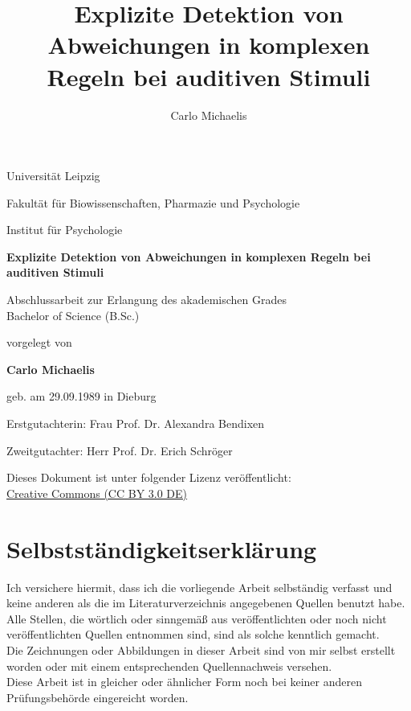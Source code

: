 \documentclass[doc,a4paper,12pt]{apa6}
\title{Explizite Detektion von Abweichungen in komplexen Regeln bei auditiven Stimuli}
\author{Carlo Michaelis}
\begin{document}

\thispagestyle{empty}

\begin{spacing}{1.1}
\begin{center}

\Large Universität Leipzig

\setlength{\parskip}{0.8em}
\normalsize Fakultät für Biowissenschaften, Pharmazie und Psychologie

\setlength{\parskip}{0.4em}
\normalsize Institut für Psychologie

\setlength{\parskip}{6em}
\LARGE \textbf{Explizite Detektion von Abweichungen in komplexen Regeln bei auditiven Stimuli}

\setlength{\parskip}{1.8em}
\normalsize Abschlussarbeit zur Erlangung des akademischen Grades\\ Bachelor of Science (B.Sc.)

\setlength{\parskip}{1.2em}
\normalsize vorgelegt von

\setlength{\parskip}{1.8em}
\Large \textbf{Carlo Michaelis}

\setlength{\parskip}{0.5em}
\normalsize geb. am 29.09.1989 in Dieburg

\setlength{\parskip}{3em}

Erstgutachterin: Frau Prof. Dr. Alexandra Bendixen

\setlength{\parskip}{0.3em}
Zweitgutachter: Herr Prof. Dr. Erich Schröger

\vfill

Dieses Dokument ist unter folgender Lizenz veröffentlicht:\\ \href{http://creativecommons.org/licenses/by/3.0/de/}{Creative Commons (CC BY 3.0 DE)}

\end{center}
\end{spacing}
\newpage

\section*{Selbstständigkeitserklärung}

Ich versichere hiermit, dass ich die vorliegende Arbeit selbständig verfasst und keine
anderen als die im Literaturverzeichnis angegebenen Quellen benutzt habe.\\
Alle Stellen, die wörtlich oder sinngemäß aus veröffentlichten oder noch nicht veröffentlichten
Quellen entnommen sind, sind als solche kenntlich gemacht.\\
Die Zeichnungen oder Abbildungen in dieser Arbeit sind von mir selbst erstellt worden oder
mit einem entsprechenden Quellennachweis versehen.\\
Diese Arbeit ist in gleicher oder ähnlicher Form noch bei keiner anderen Prüfungsbehörde
eingereicht worden.
\end{document}
